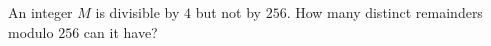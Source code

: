 An integer $M$ is divisible by $4$ but not by $256$. How many distinct remainders modulo $256$ can it have?
